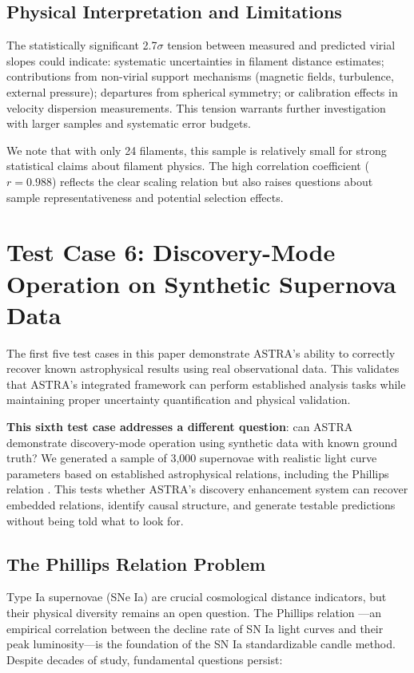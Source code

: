 \documentclass[usenatbib]{rasti}
\begin{document}
\subsection{Physical Interpretation and Limitations}

The statistically significant 2.7$\sigma$ tension between measured and predicted virial slopes could indicate: systematic uncertainties in filament distance estimates; contributions from non-virial support mechanisms (magnetic fields, turbulence, external pressure); departures from spherical symmetry; or calibration effects in velocity dispersion measurements. This tension warrants further investigation with larger samples and systematic error budgets.

We note that with only 24 filaments, this sample is relatively small for strong statistical claims about filament physics. The high correlation coefficient ($r = 0.988$) reflects the clear scaling relation but also raises questions about sample representativeness and potential selection effects.

\section{Test Case 6: Discovery-Mode Operation on Synthetic Supernova Data}

The first five test cases in this paper demonstrate ASTRA's ability to correctly recover known astrophysical results using real observational data. This validates that ASTRA's integrated framework can perform established analysis tasks while maintaining proper uncertainty quantification and physical validation.

\textbf{This sixth test case addresses a different question}: can ASTRA demonstrate discovery-mode operation using synthetic data with known ground truth? We generated a sample of 3,000 supernovae with realistic light curve parameters based on established astrophysical relations, including the Phillips relation \cite{phillips1993}. This tests whether ASTRA's discovery enhancement system can recover embedded relations, identify causal structure, and generate testable predictions without being told what to look for.

\subsection{The Phillips Relation Problem}

Type Ia supernovae (SNe Ia) are crucial cosmological distance indicators, but their physical diversity remains an open question. The Phillips relation \cite{phillips1993}---an empirical correlation between the decline rate of SN Ia light curves and their peak luminosity---is the foundation of the SN Ia standardizable candle method. Despite decades of study, fundamental questions persist:
\end{document}
